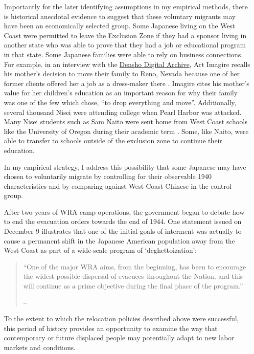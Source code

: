 \documentclass[12pt]{article}
\begin{document}
Importantly for the later identifying assumptions in my empirical methods,
there is historical anecdotal evidence to suggest that these
voluntary migrants may have been an economically selected group.
Some Japanese living on the West Coast were permitted to leave the Exclusion Zone
if they had a sponsor living in another state who was able to prove that
they had a job or educational program in that state.
Some Japanese families were able to rely on business connections.
For example, in an interview with the
\href{https://ddr.densho.org/media/ddr-manz-1/ddr-manz-1-34-transcript-2e0e58d5a9.htm}{Densho Digital Archive},
Art Imagire recalls his mother's decision to move their family to Reno, Nevada
because one of her former clients offered her a job as a dress-maker there
\citep{imagireArtImagireInterview2008}.
Imagire cites his mother's value for her children's education
as an important reason for why their family was one of the few which chose,
``to drop everything and move''.
Additionally, several thousand Nisei were attending college
when Pearl Harbor was attacked.
Many Nisei students such as Sam Naito
were sent home from West Coast schools like the University of Oregon
during their academic term \citep{naitoSamNaitoInterview2003}.
Some, like Naito, were able to transfer to schools outside of the exclusion
zone to continue their education.

In my empirical strategy, I address this possibility that
some Japanese may have chosen to voluntarily migrate
by controlling for their observable 1940 characteristics
and by comparing against West Coast Chinese in the control group.

After two years of WRA camp operations, the government began to debate how to
end the evacuation orders towards the end of 1944. One statement issued on
December 9 illustrates that one of the initial goals of interment was actually
to cause a permanent shift in the Japanese American population away from the
West Coast as part of a wide-scale program of `deghettoization':
\begin{quote}
``One of the major WRA aims, from the beginning, has been to encourage the widest possible dispersal of evacuees throughout the Nation, and this will continue as a prime objective during the final phase of the program.''

-- \citet{commissiononwartimerelocationPersonalJusticeDenied1983}
\end{quote}

To the extent to which the relocation policies described above were successful,
this period of history provides an opportunity to examine
the way that contemporary or future displaced people
may potentially adapt to new labor markets and conditions.
\end{document}

